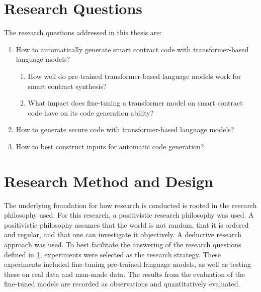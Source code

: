 \section{Research Questions}
\label{sec:research-questions}
The research questions addressed in this thesis are:

    

\begin{enumerate}[label=\textbf{RQ\arabic*.}, leftmargin=1.5cm]
    \item How to automatically generate smart contract code with transformer-based language models?
    \begin{enumerate}[label*=\textbf{\arabic*.}]
        \item How well do pre-trained transformer-based language models work for smart contract synthesis? 
        \item What impact does fine-tuning a transformer model on smart contract code have on its code generation ability?
    \end{enumerate}
    \item How to generate secure code with transformer-based language models?
    \item How to best construct inputs for automatic code generation?
\end{enumerate}

\section{Research Method and Design}
\label{sec:research-method-and-design}

The underlying foundation for how research is conducted is rooted in the research philosophy used. For this research, a positivistic research philosophy was used. A positivistic philosophy assumes that the world is not random, that it is ordered and regular, and that one can investigate it objectively.  A deductive research approach was used. To best facilitate the answering of the research questions defined in \cref{sec:research-questions}, experiments were selected as the research strategy. These experiments included fine-tuning pre-trained language models, as well as testing these on real data and man-made data. The results from the evaluation of the fine-tuned models are recorded as observations and quantitatively evaluated.




